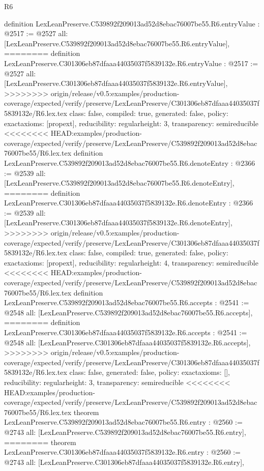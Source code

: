 \begin{lexlean}{R6}
\begin{coremodule}
{{{{{{{{{{{{{{definition LexLeanPreserve.C539892f209013ad52d8ebac76007be55.R6.entryValue : @2517 := @2527 {
  all: [LexLeanPreserve.C539892f209013ad52d8ebac76007be55.R6.entryValue],
========
definition LexLeanPreserve.C301306eb87dfaaa44035037f5839132e.R6.entryValue : @2517 := @2527 {
  all: [LexLeanPreserve.C301306eb87dfaaa44035037f5839132e.R6.entryValue],
>>>>>>>> origin/release/v0.5:examples/production-coverage/expected/verify/preserve/LexLeanPreserve/C301306eb87dfaaa44035037f5839132e/R6.lex.tex
  class: false,
  compiled: true,
  generated: false,
  policy: exact{axioms: [propext]},
  reducibility: regular{height: 3},
  transparency: semireducible
}
<<<<<<<< HEAD:examples/production-coverage/expected/verify/preserve/LexLeanPreserve/C539892f209013ad52d8ebac76007be55/R6.lex.tex
definition LexLeanPreserve.C539892f209013ad52d8ebac76007be55.R6.denoteEntry : @2366 := @2539 {
  all: [LexLeanPreserve.C539892f209013ad52d8ebac76007be55.R6.denoteEntry],
========
definition LexLeanPreserve.C301306eb87dfaaa44035037f5839132e.R6.denoteEntry : @2366 := @2539 {
  all: [LexLeanPreserve.C301306eb87dfaaa44035037f5839132e.R6.denoteEntry],
>>>>>>>> origin/release/v0.5:examples/production-coverage/expected/verify/preserve/LexLeanPreserve/C301306eb87dfaaa44035037f5839132e/R6.lex.tex
  class: false,
  compiled: true,
  generated: false,
  policy: exact{axioms: [propext]},
  reducibility: regular{height: 4},
  transparency: semireducible
}
<<<<<<<< HEAD:examples/production-coverage/expected/verify/preserve/LexLeanPreserve/C539892f209013ad52d8ebac76007be55/R6.lex.tex
definition LexLeanPreserve.C539892f209013ad52d8ebac76007be55.R6.accepts : @2541 := @2548 {
  all: [LexLeanPreserve.C539892f209013ad52d8ebac76007be55.R6.accepts],
========
definition LexLeanPreserve.C301306eb87dfaaa44035037f5839132e.R6.accepts : @2541 := @2548 {
  all: [LexLeanPreserve.C301306eb87dfaaa44035037f5839132e.R6.accepts],
>>>>>>>> origin/release/v0.5:examples/production-coverage/expected/verify/preserve/LexLeanPreserve/C301306eb87dfaaa44035037f5839132e/R6.lex.tex
  class: false,
  generated: false,
  policy: exact{axioms: []},
  reducibility: regular{height: 3},
  transparency: semireducible
}
<<<<<<<< HEAD:examples/production-coverage/expected/verify/preserve/LexLeanPreserve/C539892f209013ad52d8ebac76007be55/R6.lex.tex
theorem LexLeanPreserve.C539892f209013ad52d8ebac76007be55.R6.entry : @2560 := @2743 {
  all: [LexLeanPreserve.C539892f209013ad52d8ebac76007be55.R6.entry],
========
theorem LexLeanPreserve.C301306eb87dfaaa44035037f5839132e.R6.entry : @2560 := @2743 {
  all: [LexLeanPreserve.C301306eb87dfaaa44035037f5839132e.R6.entry],
}}}}}}}}}}}}}}}}}}}
\end{coremodule}
\end{lexlean}
